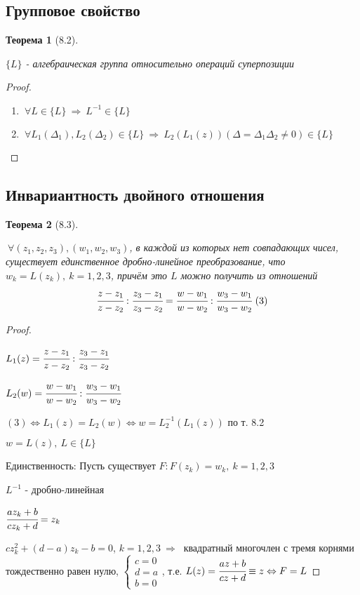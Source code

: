 \documentclass[draft]{report}
\newcommand{\forcenewline}{$\phantom{\mbox{newline}}$}
\newcommand{\then}{\ \Rightarrow\ }
\newcommand{\LRA}{\Leftrightarrow}
\newcommand{\D}{\Delta}
\newcommand{\F}{\ \forall}
\newcommand{\sys}[1]{\left\{\begin{matrix}#1\end{matrix}\right.}
\newtheorem*{theor}{Теорема}
\theoremstyle{remark}
\begin{document}
\subsection{Групповое свойство}

\begin{theor}[8.2]
\forcenewline

$\{L\}$ - алгебраическая группа относительно операций суперпозиции
\end{theor}

\begin{proof}
\forcenewline
\begin{enumerate}
\item $\F L\in\{L\}\then L^{-1}\in\{L\}$
\item $\F L_1(\D_1),L_2(\D_2)\in\{L\}\then L_2(L_1(z))(\D=\D_1\D_2\neq0)\in\{L\}$
\end{enumerate}
\end{proof}

\subsection{Инвариантность двойного отношения}
\begin{theor}[8.3]
\forcenewline

$\F(z_1,z_2,z_3),(w_1,w_2,w_3)$, в каждой из которых нет совпадающих чисел, существует единственное дробно-линейное преобразование, что $w_k=L(z_k),\ k=1,2,3$, причём это $L$ можно получить из отношений
$$
\cfrac{z-z_1}{z-z_2}:\cfrac{z_3-z_1}{z_3-z_2}=\cfrac{w-w_1}{w-w_2}:\cfrac{w_3-w_1}{w_3-w_2}\ (3)
$$
\end{theor}

\begin{proof}
\forcenewline

$L_1(z)=\cfrac{z-z_1}{z-z_2}:\cfrac{z_3-z_1}{z_3-z_2}$

$L_2(w)=\cfrac{w-w_1}{w-w_2}:\cfrac{w_3-w_1}{w_3-w_2}$

$(3) \LRA L_1(z)=L_2(w) \LRA w=L^{-1}_2(L_1(z))$ по т. 8.2

$w=L(z),\ L\in\{L\}$

Единственность: Пусть существует $F\colon F(z_k)=w_k,\ k=1,2,3$

$L^{-1}$ - дробно-линейная

$\cfrac{az_k+b}{cz_k+d}=z_k$

$cz_k^2+(d-a)z_k-b=0$, $k=1,2,3 \then $ квадратный многочлен с тремя корнями тождественно равен нулю, $\sys{c=0 \\ d=a \\ b=0}$, т.е. $L(z)=\cfrac{az+b}{cz+d}\equiv z \LRA F=L$
\end{proof}
\end{document}
